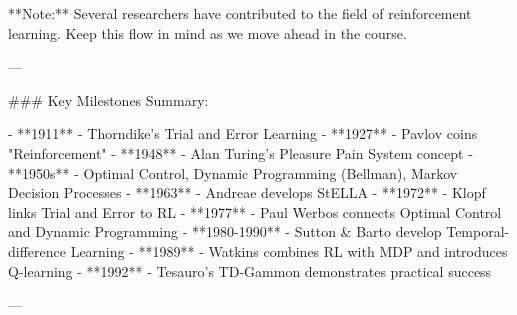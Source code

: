 **Note:** Several researchers have contributed to the field of reinforcement learning. Keep this flow in mind as we move ahead in the course.

---

### Key Milestones Summary:

- **1911** - Thorndike's Trial and Error Learning
- **1927** - Pavlov coins "Reinforcement"
- **1948** - Alan Turing's Pleasure Pain System concept
- **1950s** - Optimal Control, Dynamic Programming (Bellman), Markov Decision Processes
- **1963** - Andreae develops StELLA
- **1972** - Klopf links Trial and Error to RL
- **1977** - Paul Werbos connects Optimal Control and Dynamic Programming
- **1980-1990** - Sutton & Barto develop Temporal-difference Learning
- **1989** - Watkins combines RL with MDP and introduces Q-learning
- **1992** - Tesauro's TD-Gammon demonstrates practical success

---